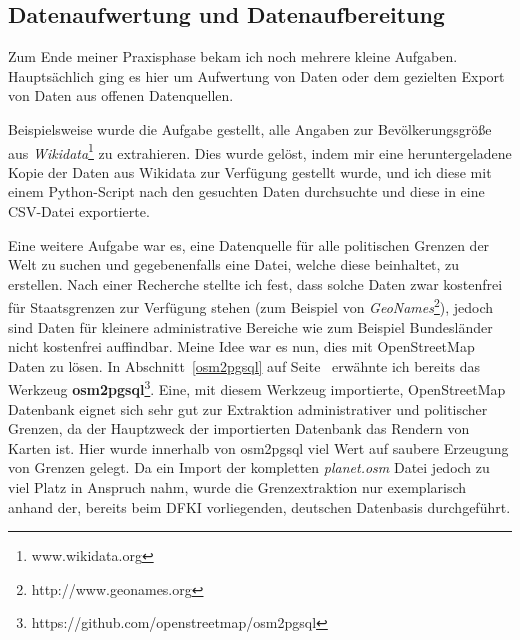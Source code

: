 \subsection{Datenaufwertung und Datenaufbereitung}
Zum Ende meiner Praxisphase bekam ich noch mehrere kleine Aufgaben.
Hauptsächlich ging es hier um Aufwertung von Daten oder dem gezielten Export von Daten aus offenen Datenquellen.

Beispielsweise wurde die Aufgabe gestellt, alle Angaben zur Bevölkerungsgröße aus \textit{Wikidata}\footnote{www.wikidata.org} zu extrahieren.
Dies wurde gelöst, indem mir eine heruntergeladene Kopie der Daten aus Wikidata zur Verfügung gestellt wurde, und ich diese mit einem Python-Script nach den gesuchten Daten durchsuchte und diese in eine CSV-Datei exportierte.

Eine weitere Aufgabe war es, eine Datenquelle für alle politischen Grenzen der Welt zu suchen und gegebenenfalls eine Datei, welche diese beinhaltet, zu erstellen.
Nach einer Recherche stellte ich fest, dass solche Daten zwar kostenfrei für Staatsgrenzen zur Verfügung stehen (zum Beispiel von \textit{GeoNames}\footnote{http://www.geonames.org}), jedoch sind Daten für kleinere administrative Bereiche wie zum Beispiel Bundesländer nicht kostenfrei auffindbar.
Meine Idee war es nun, dies mit OpenStreetMap Daten zu lösen. In Abschnitt~\ref{osm2pgsql} auf Seite~\pageref{osm2pgsql} erwähnte ich bereits das Werkzeug \textbf{osm2pgsql}\footnote{https://github.com/openstreetmap/osm2pgsql}.
Eine, mit diesem Werkzeug importierte, OpenStreetMap Datenbank eignet sich sehr gut zur Extraktion administrativer und politischer Grenzen, da der Hauptzweck der importierten Datenbank das Rendern von Karten ist.
Hier wurde innerhalb von osm2pgsql viel Wert auf saubere Erzeugung von Grenzen gelegt.
Da ein Import der kompletten \textit{planet.osm} Datei jedoch zu viel Platz in Anspruch nahm, wurde die Grenzextraktion nur exemplarisch anhand der, bereits beim DFKI vorliegenden, deutschen Datenbasis durchgeführt.
